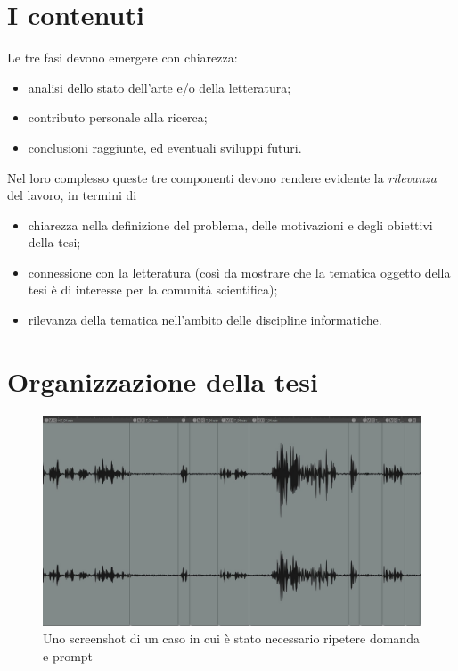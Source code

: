 \documentclass[12pt]{report}
\begin{document}
\section{I contenuti}
\label{sec:contenuti}

Le tre fasi devono emergere con chiarezza:
\begin{itemize}
	\item analisi dello stato dell'arte e/o della letteratura;
	\item contributo personale alla ricerca;
	\item conclusioni raggiunte, ed eventuali sviluppi futuri.
\end{itemize}

Nel loro complesso queste tre componenti devono rendere evidente la {\em rilevanza} del lavoro, in termini di
\begin{itemize}
\item chiarezza nella definizione del problema, delle motivazioni e degli obiettivi della tesi; 
\item connessione con la letteratura (cos\`i da mostrare che la tematica oggetto della tesi \`e di interesse per la comunit\`a scientifica);
\item rilevanza della tematica nell'ambito delle discipline informatiche.
\end{itemize}


\section{Organizzazione della tesi}
\label{sec:organizzazione}


\begin{figure}[t]
	\includegraphics[width = 150mm, trim={0 25mm 0 0}]{img/1}
	\caption{Uno screenshot di un caso in cui è stato necessario ripetere domanda e prompt}
	\label{fig:waveform}
\end{figure}
\end{document}
